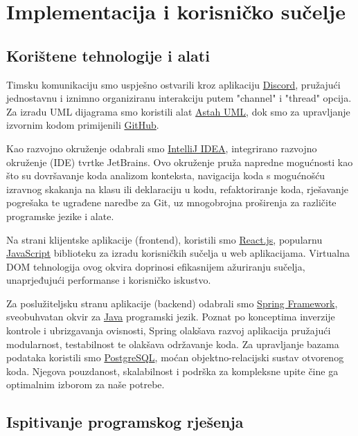 
\chapter{Implementacija i korisničko sučelje}

	
		
		\section{Korištene tehnologije i alati}

        Timsku komunikaciju smo uspješno ostvarili kroz aplikaciju \href{https://discord.com/}{Discord}, pružajući jednostavnu i iznimno organiziranu interakciju putem "channel" i "thread" opcija. Za izradu UML dijagrama smo koristili alat \href{https://astah.net/products/astah-uml/}{Astah UML}, dok smo za upravljanje izvornim kodom primijenili \href{https://github.com/}{GitHub}.

        Kao razvojno okruženje odabrali smo \href{https://www.jetbrains.com/idea/}{IntelliJ IDEA}, integrirano razvojno okruženje (IDE) tvrtke JetBrains. Ovo okruženje pruža napredne mogućnosti kao što su dovršavanje koda analizom konteksta, navigacija koda s mogućnošću izravnog skakanja na klasu ili deklaraciju u kodu, refaktoriranje koda, rješavanje pogrešaka te ugrađene naredbe za Git, uz mnogobrojna proširenja za različite programske jezike i alate.

        Na strani klijentske aplikacije (frontend), koristili smo \href{https://reactjs.org/}{React.js}, popularnu \href{https://www.javascript.com/}{JavaScript} biblioteku za izradu korisničkih sučelja u web aplikacijama. Virtualna DOM tehnologija ovog okvira doprinosi efikasnijem ažuriranju sučelja, unaprjeđujući performanse i korisničko iskustvo.

        Za poslužiteljsku stranu aplikacije (backend) odabrali smo \href{https://spring.io/}{Spring Framework}, sveobuhvatan okvir za \href{https://www.java.com/en/}{Java} programski jezik. Poznat po konceptima inverzije kontrole i ubrizgavanja ovisnosti, Spring olakšava razvoj aplikacija pružajući modularnost, testabilnost te olakšava održavanje koda. Za upravljanje bazama podataka koristili smo \href{https://www.postgresql.org/}{PostgreSQL}, moćan objektno-relacijski sustav otvorenog koda. Njegova pouzdanost, skalabilnost i podrška za kompleksne upite čine ga optimalnim izborom za naše potrebe.
			
			\eject
		
	
		\section{Ispitivanje programskog rješenja}
			


